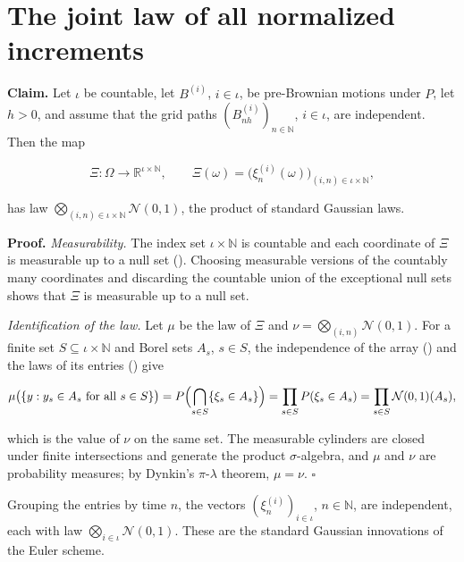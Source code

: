 \documentclass[11pt,a4paper]{article}
\begin{document}
\section{\texorpdfstring{The joint law of all normalized increments}{The joint law of all normalized increments}}


\textbf{Claim.} Let \(\iota\) be countable, let \(B^{(i)}\), \(i\in\iota\), be pre-Brownian motions under \(P\), let \(h>0\), and assume that the grid paths \((B^{(i)}_{nh})_{n\in\mathbb N}\), \(i\in\iota\), are independent. Then the map


\[\Xi:\Omega\to\mathbb R^{\iota\times\mathbb N},\qquad\Xi(\omega)=\bigl(\xi^{(i)}_n(\omega)\bigr)_{(i,n)\in\iota\times\mathbb N},\]


has law \(\bigotimes_{(i,n)\in\iota\times\mathbb N}\mathcal N(0,1)\), the product of standard Gaussian laws.




\textbf{Proof.} \emph{Measurability.} The index set \(\iota\times\mathbb N\) is countable and each coordinate of \(\Xi\) is measurable up to a null set (\cite[Section~3.31.2]{LangevinLean2026ULASC}). Choosing measurable versions of the countably many coordinates and discarding the countable union of the exceptional null sets shows that \(\Xi\) is measurable up to a null set.




\emph{Identification of the law.} Let \(\mu\) be the law of \(\Xi\) and \(\nu=\bigotimes_{(i,n)}\mathcal N(0,1)\). For a finite set \(S\subseteq\iota\times\mathbb N\) and Borel sets \(A_s\), \(s\in S\), the independence of the array (\cite[Section~3.31.7]{LangevinLean2026ULASC}) and the laws of its entries (\cite[Section~3.31.2]{LangevinLean2026ULASC}) give


\[\mu\bigl(\{y:y_s\in A_s\text{ for all }s\in S\}\bigr)=P\Bigl(\bigcap_{s\in S}\{\xi_s\in A_s\}\Bigr)=\prod_{s\in S}P(\xi_s\in A_s)=\prod_{s\in S}\mathcal N(0,1)(A_s),\]


which is the value of \(\nu\) on the same set. The measurable cylinders are closed under finite intersections and generate the product \(\sigma\)-algebra, and \(\mu\) and \(\nu\) are probability measures; by Dynkin's \(\pi\)-\(\lambda\) theorem, \(\mu=\nu\). \(\square\)




Grouping the entries by time \(n\), the vectors \((\xi^{(i)}_n)_{i\in\iota}\), \(n\in\mathbb N\), are independent, each with law \(\bigotimes_{i\in\iota}\mathcal N(0,1)\). These are the standard Gaussian innovations of the Euler scheme.
\end{document}
